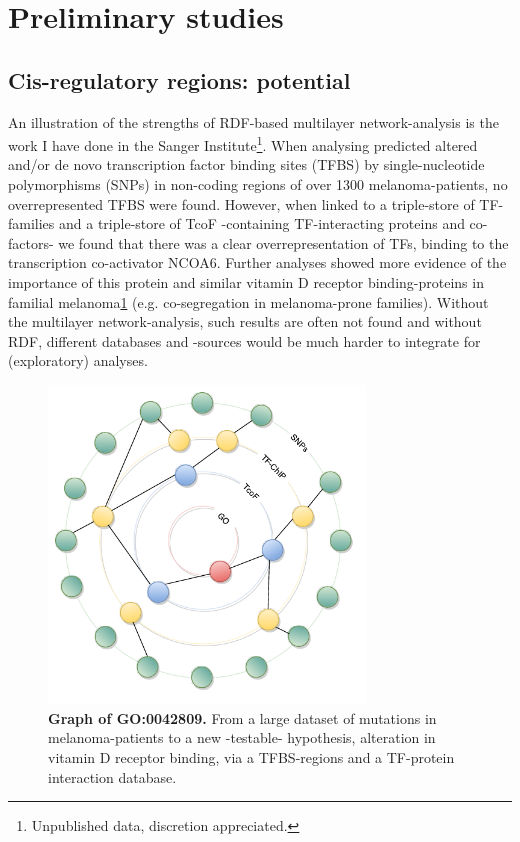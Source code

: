 \documentclass[twoside,fontsize=12pt]{article}
\begin{document}
\section*{Preliminary studies}
\subsection*{Cis-regulatory regions: potential}
An illustration of the strengths of RDF-based multilayer network-analysis is the work I have done in the Sanger Institute\footnote{Unpublished data, discretion appreciated.}. When analysing predicted altered and/or de novo transcription factor binding sites (TFBS) by single-nucleotide polymorphisms (SNPs) in non-coding regions of over 1300 melanoma-patients, no overrepresented TFBS were found. However, when linked to a triple-store of TF-families and a triple-store of TcoF -containing TF-interacting proteins and co-factors- we found that there was a clear overrepresentation of TFs, binding to the transcription co-activator NCOA6. Further analyses showed more evidence of the importance of this protein and similar vitamin D receptor binding-proteins in familial melanoma\ref{fig:mela} (e.g. co-segregation in melanoma-prone families). Without the multilayer network-analysis, such results are often not found and without RDF, different databases and -sources would be much harder to integrate for (exploratory) analyses. 
\begin{figure}[H]
    \centering
    \includegraphics[width=0.75\textwidth]{rondjeGraphs.pdf}
    \caption{\textbf{Graph of GO:0042809.} From a large dataset of mutations in melanoma-patients to a new -testable- hypothesis, alteration in vitamin D receptor binding, via a TFBS-regions and a TF-protein interaction database.}
    \label{fig:mela}
\end{figure}
\end{document}
